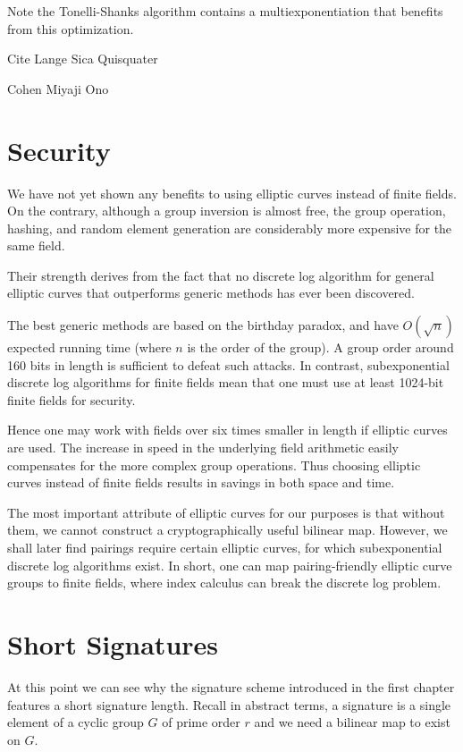 Note the Tonelli-Shanks algorithm contains a multiexponentiation
that benefits from this optimization.

Cite Lange Sica Quisquater

Cohen Miyaji Ono

\section {Security}

We have not yet shown any benefits to using elliptic curves instead
of finite fields. On the contrary, although a group inversion is
almost free, the group operation, hashing, and random element generation
are considerably more expensive for the same field.

Their strength derives from the fact that no discrete log algorithm for
general elliptic curves that outperforms generic methods has ever been
discovered.

The best generic methods are based on the birthday paradox, and have
$O(\sqrt{n})$ expected running time (where $n$ is the order of the group).
A group order around 160 bits in length is sufficient to defeat such attacks.
In contrast, subexponential discrete log algorithms for finite fields
mean that one must use at least 1024-bit finite fields for security.

Hence one may work with fields over six times smaller in length
if elliptic curves are used. The increase in speed in
the underlying field arithmetic easily compensates for the more
complex group operations. Thus choosing elliptic curves instead of
finite fields results in savings in both space and time.

The most important attribute of elliptic curves for our purposes
is that without them, we cannot construct a cryptographically
useful bilinear map.
However, we shall later find pairings require certain elliptic curves,
for which subexponential discrete log algorithms exist. In short,
one can map pairing-friendly elliptic curve groups to finite fields, where
index calculus can break the discrete log problem.

\section {Short Signatures}

At this point we can see why
the signature scheme introduced
in the first chapter features a short signature length.
Recall in abstract terms,
a signature is a single element of a cyclic group $G$ of prime order $r$
and we need a bilinear map to exist on $G$.

